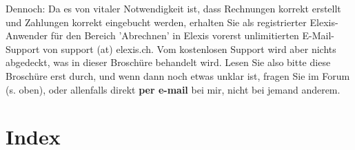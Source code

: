 \documentclass[a4paper]{scrartcl}
\begin{document}
Dennoch: Da es von vitaler Notwendigkeit ist, dass Rechnungen korrekt erstellt und Zahlungen korrekt eingebucht werden, erhalten Sie als registrierter Elexis-Anwender für den Bereich 'Abrechnen' in Elexis vorerst unlimitierten E-Mail-Support von support (at) elexis.ch. Vom kostenlosen Support wird aber nichts abgedeckt, was in dieser Broschüre behandelt wird. Lesen Sie also bitte diese Broschüre erst durch, und wenn dann noch etwas unklar ist, fragen Sie im Forum (s. oben), oder allenfalls direkt \textbf{per e-mail} bei mir, nicht bei jemand anderem.
\clearpage
\section{Index}
\printindex
\end{document}
